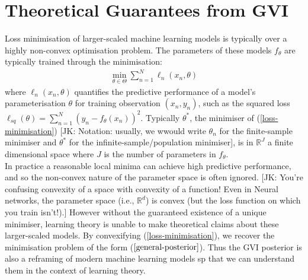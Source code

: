 \documentclass[twoside,11pt]{article}
\newcommand{\jk}[1]{{\color{blue} [JK: #1]}}
\begin{document}
\section{Theoretical Guarantees from GVI \cite{wild2023rigorous}}
Loss minimisation of larger-scaled machine learning models is typically over a highly non-convex optimisation problem. The parameters of these models $f_{\theta}$ are typically trained through the minimisation:
\begin{align}
\min_{\theta \in \Theta} \sum_{n=1}^N\ell_n(x_n, \theta)
\label{loss-minimisation}
\end{align}
where $\ell_n(x_n, \theta)$ quantifies the predictive performance of a model's parameterisation $\theta$ for training observation $(x_n, y_n)$, such as the squared loss $\ell_{sq}(\theta) = \sum_{n=1}^N \left(y_n - f_{\theta}(x_n)\right)^2$. Typically $\theta^*$, the minimiser of (\ref{loss-minimisation}) \jk{Notation: usually, we wwould write $\theta_n$ for the finite-sample minimiser and $\theta^*$ for the infinite-sample/population minimiser}, is in $ \mathbb{R}^J$ a finite dimensional space where $J$ is the number of parameters in $f_{\theta}$.\\
\newline
In practice a reasonable local minima can achieve high predictive performance, and so the non-convex nature of the parameter space is often ignored.
%
\jk{You're confusing convexity of a space with convexity of a function! Even in Neural networks, the parameter space (i.e., $\mathbb{R}^d$) is convex (but the loss function on which you train isn't!).} 
%
However without the guaranteed existence of a unique minimiser, learning theory is unable to make theoretical claims about these larger-scaled models. By convexifying (\ref{loss-minimisation}), we recover the minimisation problem of the form ($\ref{general-posterior}$). Thus the GVI posterior is also a reframing of modern machine learning models sp that we can understand them in the context of learning theory.
\end{document}
